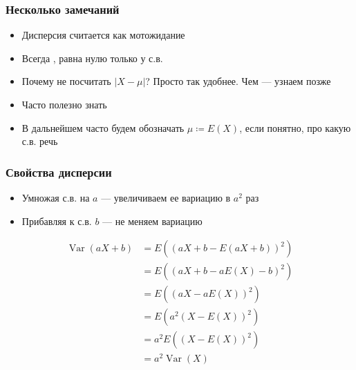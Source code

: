 \documentclass[hyperref=unicode,graphics=pdflatex,13pt,xcolor={usenames,dvipsnames}]{beamer}
\renewcommand\emph[1]{{\color{blue}{#1}}}
\newcommand\pitem{\pause\item}
\DeclareMathOperator{\Var}{Var}
\begin{document}
\begin{frame}
  \frametitle{Несколько замечаний}

  \begin{center}
  \end{center}

  \begin{itemize}
    \pitem Дисперсия считается как мотожидание \emph{функции от с.в.}
    \pitem Всегда \emph{неотрицательна}, равна нулю только у \emph{детерминированной} с.в.
    \pitem Почему не посчитать $|X - \mu|$? Просто так удобнее. Чем --- узнаем позже
    \pitem Часто полезно знать \emph{среднеквадратичное отклонение} 
    \begin{center}
    \end{center}
    \pitem В дальнейшем часто будем обозначать $\mu \coloneqq E(X)$, если понятно, про какую с.в. речь
  \end{itemize}
\end{frame}

\begin{frame}
  \frametitle{Свойства дисперсии}
  \begin{center}
  \end{center}
  \begin{itemize}
    \item Умножая с.в. на $a$ --- увеличиваем ее вариацию в $a^2$ раз
    \item Прибавляя к с.в. $b$ --- не меняем вариацию
  \end{itemize}

  \pause
  \begin{align*}
    \Var(aX + b) &= E\left((aX+b - E(aX + b))^2\right) \\
                 &= E\left((aX+b - aE(X) - b)^2\right) \\
                 &= E\left((aX - aE(X))^2\right) \\
                 &= E\left(a^2(X - E(X))^2\right) \\
                 &= a^2E\left((X - E(X))^2\right) \\
                 &= a^2\Var(X)
  \end{align*}
\end{frame}
\end{document}
